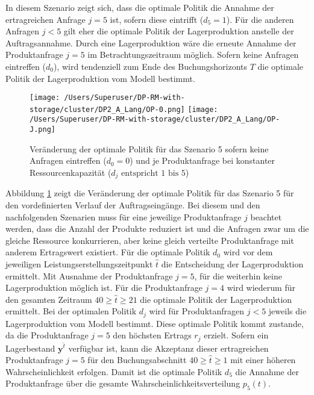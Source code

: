 In diesem Szenario zeigt sich, dass die optimale Politik die Annahme der ertragreichen Anfrage $j=5$ ist, sofern diese eintrifft ($d_5=1$).  Für die anderen Anfragen $j<5$ gilt eher die optimale Politik der Lagerproduktion anstelle der Auftragsannahme. Durch eine Lagerproduktion wäre die erneute Annahme der Produktanfrage $j=5$ im Betrachtungszeitraum möglich. Sofern keine Anfragen eintreffen ($d_0$), wird tendenziell zum Ende des Buchungshorizonts $T$ die optimale Politik der Lagerproduktion vom Modell bestimmt.

\begin{figure}[h!]     
\begin{center}
\texttt{[image: /Users/Superuser/DP-RM-with-storage/cluster/DP2\_A\_Lang/OP-0.png]}
\texttt{[image: /Users/Superuser/DP-RM-with-storage/cluster/DP2\_A\_Lang/OP-J.png]}
    \caption{Veränderung der optimale Politik für das Szenario 5 sofern keine Anfragen eintreffen ($d_0=0$) und je Produktanfrage bei konstanter Ressourcenkapazität ($d_j\text{ entspricht }1\text{ bis }5$)}  \label{SV5}
  \end{center}
\end{figure}

Abbildung \ref{SV5} zeigt die Veränderung der optimale Politik für das Szenario 5 für den vordefinierten Verlauf der Auftragseingänge. Bei diesem und den nachfolgenden Szenarien muss für eine jeweilige Produktanfrage $j$ beachtet werden, dass die Anzahl der Produkte reduziert ist und die Anfragen zwar um die gleiche Ressource konkurrieren, aber keine gleich verteilte Produktanfrage mit anderem Ertragswert existiert. Für die optimale Politik $d_0$ wird vor dem jeweiligen Leistungserstellungszeitpunkt $\hat t$ die Entscheidung der Lagerproduktion ermittelt. Mit Ausnahme der Produktanfrage $j=5$, für die weiterhin keine Lagerproduktion möglich ist. Für die Produktanfrage $j=4$ wird wiederum für den gesamten Zeitraum $40\ge\hat t\ge 21$ die optimale Politik der Lagerproduktion ermittelt. Bei der optimalen Politik $d_j$ wird für Produktanfragen $j<5$ jeweils die Lagerproduktion vom Modell bestimmt. Diese optimale Politik kommt zustande, da die Produktanfrage $j=5$ den höchsten Ertrags $r_j$ erzielt. Sofern ein Lagerbestand $\textbf{y}^{\hat t}$ verfügbar ist, kann die Akzeptanz dieser ertragreichen Produktanfrage $j=5$ für den Buchungsabschnitt $40\ge\hat t\ge1$ mit einer höheren Wahrscheinlichkeit erfolgen. Damit ist die optimale Politik $d_5$ die Annahme der Produktanfrage über die gesamte Wahrscheinlichkeitsverteilung $p_5(t)$.

